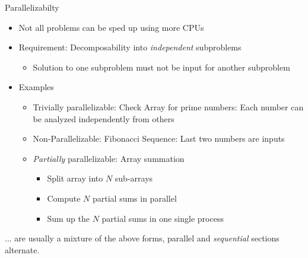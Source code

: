 \begin{frame}{Parallelizabilty}
%
\begin{itemize}
\item Not all problems can be sped up using more CPUs
\item Requirement: Decomposability into \emph{independent} subproblems
	\begin{itemize}
	\item Solution to one subproblem must not be input for another subproblem
	\end{itemize}
\item Examples
\begin{itemize}
	\item Trivially parallelizable: Check Array for prime numbers: Each number can be analyzed independently from others
	\item Non-Parallelizable: Fibonacci Sequence: Last two numbers are inputs
	\item \emph{Partially} parallelizable: Array summation
		\begin{itemize}
		\item Split array into $N$ sub-arrays
		\item Compute $N$ partial sums in parallel
		\item Sum up the $N$ partial sums in one single process
		\end{itemize}
	\end{itemize}
\end{itemize}
%
\begin{hintbox}
\small
... are usually a mixture of the above forms, \ie parallel and \emph{sequential} sections alternate.
\end{hintbox}
%
\end{frame}


